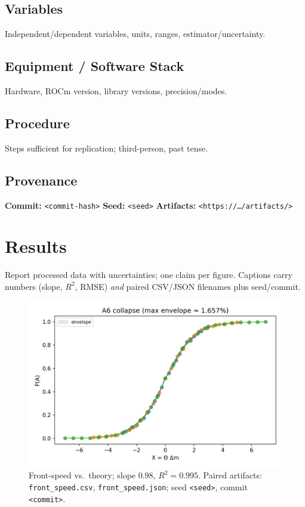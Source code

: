 \documentclass{article}
\newcommand{\provenance}[3]{\textbf{Commit:} \texttt{#1}\quad
  \textbf{Seed:} \texttt{#2}\quad
  \textbf{Artifacts:} \texttt{#3}}
\begin{document}
\subsection*{Variables}
Independent/dependent variables, units, ranges, estimator/uncertainty.

\subsection*{Equipment / Software Stack}
Hardware, ROCm version, library versions, precision/modes.

\subsection*{Procedure}
Steps sufficient for replication; third-person, past tense.

\subsection*{Provenance}
\provenance{<commit-hash>}{<seed>}{<https://…/artifacts/>}

\section{Results}
Report processed data with uncertainties; one claim per figure. Captions carry numbers
(slope, $R^2$, RMSE) \emph{and} paired CSV/JSON filenames plus seed/commit.

\begin{figure}[t]
  \centering
  \includegraphics[width=0.8\linewidth]{figures/example-result}
  \caption{Front-speed vs.\ theory; slope $0.98$, $R^2=0.995$.
  Paired artifacts: \texttt{front\_speed.csv}, \texttt{front\_speed.json};
  seed \texttt{<seed>}, commit \texttt{<commit>}.}
  \label{fig:frontspeed}
\end{figure}
\end{document}
